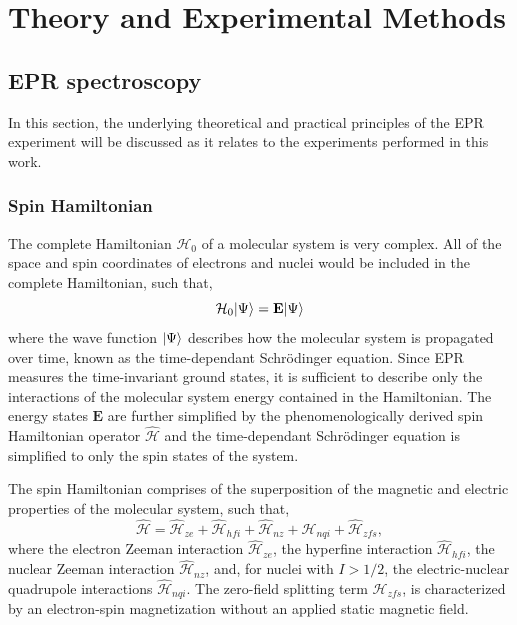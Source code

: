 \chapter[Theory and Experimental Methods]{Theory and Experimental Methods}
\section{EPR spectroscopy}

In this section, the underlying theoretical and practical principles of the EPR experiment will be discussed as it relates to the experiments performed in this work. 

\subsection{Spin Hamiltonian}
The complete Hamiltonian $\mathcal{H}_0$ of a molecular system is very complex. All of the space and spin coordinates of electrons and nuclei would be included in the complete Hamiltonian, such that,
\begin{equation}
    \mathcal{H}_0 \lvert\Psi\rangle = {\mathbf E} \lvert\Psi\rangle
\end{equation}
where the wave function $\lvert\Psi\rangle$ describes how the molecular system is propagated over time, known as the time-dependant Schr\"{o}dinger equation. Since EPR measures the time-invariant ground states, it is sufficient to describe only the interactions of the molecular system energy contained in the Hamiltonian. The energy states ${\mathbf E}$ are further simplified by the phenomenologically derived spin Hamiltonian operator $\hat{\mathcal{H}}$ and the time-dependant Schr\"{o}dinger equation is simplified to only the spin states of the system. \cite{SpinDyn,abragam1961} 

The spin Hamiltonian comprises of the superposition of the magnetic and electric properties of the molecular system, such that,
\begin{equation}
    \hat{\mathcal{H}} = \hat{\mathcal{H}}_{ze} + \hat{\mathcal{H}}_{hfi} + \hat{\mathcal{H}}_{nz} + \hat{\mathcal{H}}_{nqi} + \hat{\mathcal{H}}_{zfs},
\end{equation}
where the electron Zeeman interaction $\hat{\mathcal{H}}_{ze}$, the hyperfine interaction $\hat{\mathcal{H}}_{hfi}$, the nuclear Zeeman interaction $\hat{\mathcal{H}}_{nz}$, and, for nuclei with $I > 1/2$, the electric-nuclear quadrupole interactions $\hat{\mathcal{H}}_{nqi}$. The zero-field splitting term $ \hat{\mathcal{H}}_{zfs}$, is characterized by an electron-spin magnetization without an applied static magnetic field. 

